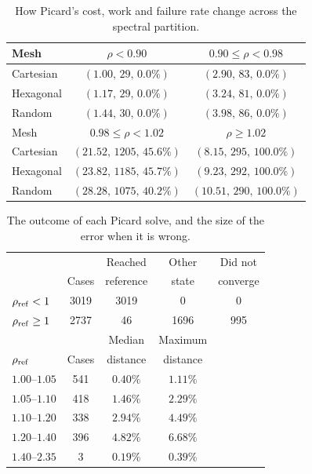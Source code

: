 \begin{table}[htb]
\centering
\caption{How Picard's cost, work and failure rate change across the spectral partition.}
\label{tab:final_picard}
\setlength{\tabcolsep}{7pt}
\begin{tabular}{lcc}
\toprule
\rowcolor{gray!12}
Mesh &
$\rho<0.90$ &
$0.90\leq\rho<0.98$ \\
\midrule
Cartesian &
$(1.00,\,29,\,0.0\%)$ &
$(2.90,\,83,\,0.0\%)$ \\
Hexagonal &
$(1.17,\,29,\,0.0\%)$ &
$(3.24,\,81,\,0.0\%)$ \\
Random &
$(1.44,\,30,\,0.0\%)$ &
$(3.98,\,86,\,0.0\%)$ \\

\addlinespace[2pt]
\rowcolor{gray!12}
Mesh &
$0.98\leq\rho<1.02$ &
$\rho\geq1.02$ \\
\midrule
Cartesian &
$(21.52,\,1205,\,45.6\%)$ &
$(8.15,\,295,\,100.0\%)$ \\
Hexagonal &
$(23.82,\,1185,\,45.7\%)$ &
$(9.23,\,292,\,100.0\%)$ \\
Random &
$(28.28,\,1075,\,40.2\%)$ &
$(10.51,\,290,\,100.0\%)$ \\
\bottomrule
\end{tabular}
\end{table}




\begin{table}[htb]
\centering
\caption{The outcome of each Picard solve, and the size of the error when it is wrong.}
\label{tab:branch_classification}
\setlength{\tabcolsep}{7pt}
\begin{tabular}{lcccc}
\toprule
\rowcolor{gray!12}
 & & Reached & Other & Did not \\
\rowcolor{gray!12}
 & Cases & reference & state & converge \\
\midrule
$\rho_{\rm ref}<1$ & 3019 & 3019 & 0 & 0 \\
$\rho_{\rm ref}\geq1$ & 2737 & 46 & 1696 & 995 \\
\addlinespace[4pt]
\rowcolor{gray!12}
 & & Median & Maximum & \\
\rowcolor{gray!12}
$\rho_{\rm ref}$ & Cases & distance & distance & \\
\midrule
$1.00$--$1.05$ & 541 & $0.40\%$ & $1.11\%$ & \\
$1.05$--$1.10$ & 418 & $1.46\%$ & $2.29\%$ & \\
$1.10$--$1.20$ & 338 & $2.94\%$ & $4.49\%$ & \\
$1.20$--$1.40$ & 396 & $4.82\%$ & $6.68\%$ & \\
$1.40$--$2.35$ & 3 & $0.19\%$ & $0.39\%$ & \\
\bottomrule
\end{tabular}
\end{table}


